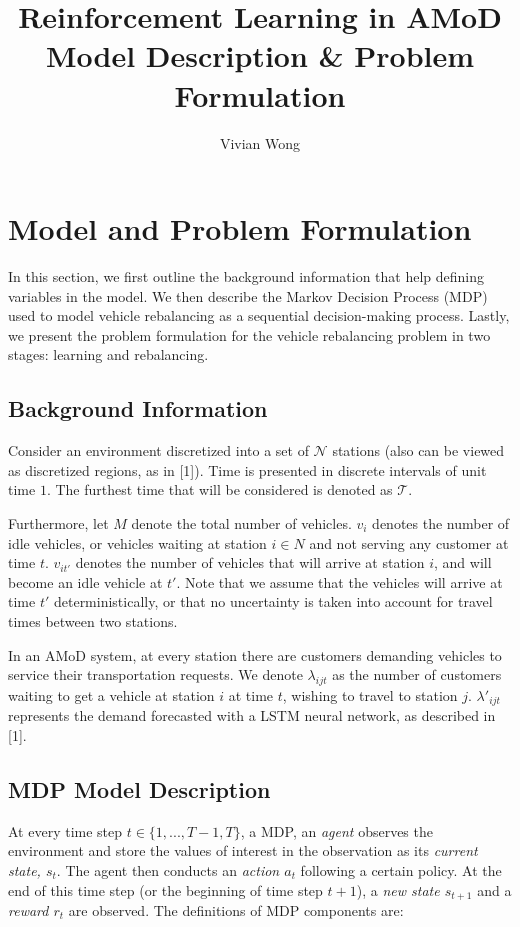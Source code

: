 \documentclass[letterpaper, 10 pt, conference]{ieeeconf}  %
\title{\LARGE \bf Reinforcement Learning in AMoD\\
Model Description \& Problem Formulation
}
\author{Vivian Wong}
\begin{document}
\maketitle
\thispagestyle{empty}
\pagestyle{empty}


\section{Model and Problem Formulation}
In this section, we first outline the background information that help defining variables in the model. We then describe the Markov Decision Process (MDP) used to model vehicle rebalancing as a sequential decision-making process. Lastly, we present the problem formulation for the vehicle rebalancing problem in two stages: learning and rebalancing. 

\subsection{Background Information}
Consider an environment discretized into a set of $\mathcal{N}$ stations (also can be viewed as discretized regions, as in [1]). Time is presented in discrete intervals of unit time $1$. The furthest time that will be considered is denoted as $\mathcal{T}$.

Furthermore, let $M$ denote the total number of vehicles. $v_i$ denotes the number of idle vehicles, or vehicles waiting at station $i\in N$ and not serving any customer at time $t$. $v_{it'}$ denotes the number of vehicles that will arrive at station $i$, and will become an idle vehicle at $t'$. Note that we assume that the vehicles will arrive at time $t'$ deterministically, or that no uncertainty is taken into account for travel times between two stations. 

In an AMoD system, at every station there are customers demanding vehicles to service their transportation requests. We denote $\lambda_{ijt}$ as the number of customers waiting to get a vehicle at station $i$ at time $t$, wishing to travel to station $j$. $\lambda'_{ijt}$ represents the demand forecasted with a LSTM neural network, as described in [1].
\subsection{MDP Model Description}
At every time step $t \in \{1,...,T-1,T\}$, a MDP, an \textit{agent} observes the environment and store the values of interest in the observation as its \textit{current state, $s_t$}. The agent then conducts an \textit{action $a_t$} following a certain policy. At the end of this time step (or the beginning of time step $t+1$), a \textit{new state $s_{t+1}$} and a \textit{reward $r_t$} are observed. The definitions of MDP components are:\\
\end{document}

